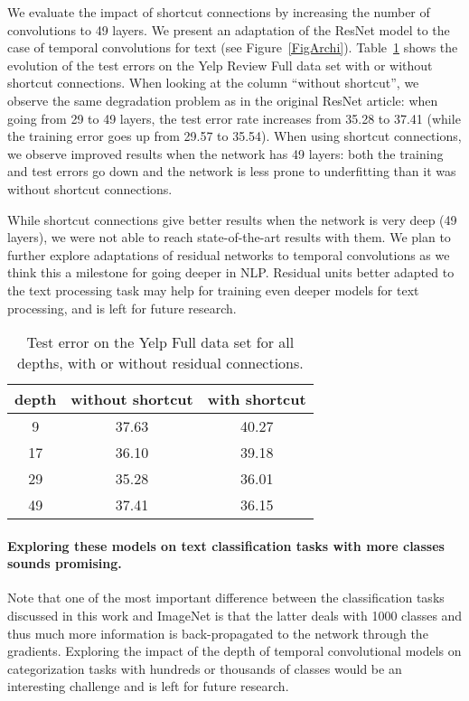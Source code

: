 \documentclass[a4paper,11pt]{article}
\begin{document}
{We evaluate the impact of shortcut connections by increasing the number of
convolutions to 49 layers. We present an adaptation of the ResNet model to the
case of temporal convolutions for text (see Figure~\ref{FigArchi}).
Table~\ref{figresnet} shows the evolution of the test errors on the Yelp
Review Full data set with or without shortcut connections. When looking at the column ``without shortcut'', we observe the
same degradation problem as in the original ResNet article: when going from 29
to 49 layers, the test error rate
increases from 35.28 to 37.41 (while the training error goes up from 29.57 to 35.54).  When using shortcut connections,
we observe improved results when the network has 49 layers: both the training
and test errors go down and the network is less prone to underfitting than it
was without shortcut connections.

While shortcut connections give better results when the network is very deep
(49 layers), we were not able to reach state-of-the-art results with them. We
plan to further explore adaptations of residual networks to temporal
convolutions as we think this a milestone for going deeper in NLP. Residual units \cite{He:2015:resnet} better adapted to the text processing task may help for training even deeper models for text processing, and is left for future research.



\begin{table}[!ht]
  \centering
  \begin{tabular}{|c|cc|}
    \hline
     depth& without shortcut & with shortcut \\
         \hline
    9 & 37.63 & 40.27 \\
    17 & 36.10 & 39.18 \\
    29 & 35.28 & 36.01  \\
    49 & 37.41 & 36.15 \\
    \hline
  \end{tabular}
    \caption{Test error on the Yelp Full data set
           for all depths, with or without residual connections.}
     \label{figresnet}
    \vspace{-3mm}

           
\end{table}


\paragraph{Exploring these models on text classification tasks with more classes sounds promising.}
Note that one of the most important difference between the classification tasks
discussed in this work and ImageNet is that the latter deals with 1000
classes and thus much more information is back-propagated to the network through
the gradients.  Exploring the impact
of the depth of temporal convolutional models on categorization tasks with
hundreds or thousands of classes would be an interesting challenge and is left
for future research.



}
\end{document}
